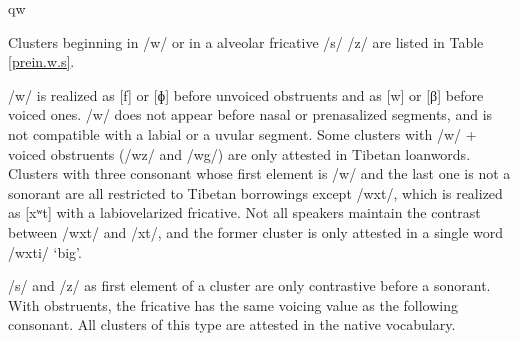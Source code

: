 qw\documentclass[oldfontcommands,oneside,a4paper,11pt]{article}
\begin{document}
 Clusters beginning in /w/ or in a alveolar fricative /s/ /z/ are listed in Table \ref{prein.w.s}. 
 
 /w/ is realized as [f] or [ɸ] before unvoiced obstruents and as [w] or [β] before voiced ones. /w/ does not appear before nasal or prenasalized segments, and is not compatible with a labial or a uvular segment. Some clusters with /w/ + voiced obstruents (/wz/ and /wg/) are only attested in Tibetan loanwords. Clusters with three consonant whose first element is /w/ and the last one is not a sonorant are all restricted to Tibetan borrowings except /wxt/, which is realized as [xʷt] with a labiovelarized fricative. Not all speakers maintain the contrast between /wxt/ and /xt/, and the former cluster is only attested in a single word /wxti/ `big'.
 
 /s/ and /z/ as first element of a cluster are only contrastive before a sonorant. With obstruents, the fricative has the same voicing value as the following consonant. All clusters of this type are attested in the native vocabulary.
 
\end{document}
